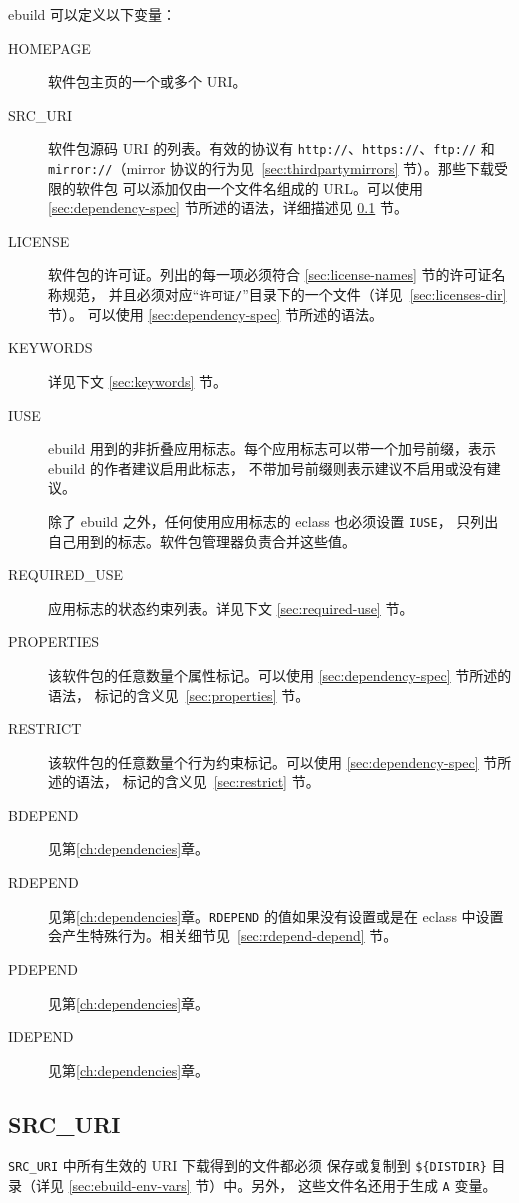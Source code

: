 ebuild 可以定义以下变量：
\begin{description}
\item[HOMEPAGE] 软件包主页的一个或多个 URI。
\item[SRC_URI] 软件包源码 URI 的列表。有效的协议有 \texttt{http://}、\texttt{https://}、\texttt{ftp://} 和
    \texttt{mirror://}（mirror 协议的行为见~\ref{sec:thirdpartymirrors} 节）。那些下载受限的软件包
    可以添加仅由一个文件名组成的 URL。可以使用 \ref{sec:dependency-spec} 节所述的语法，详细描述见
    \ref{sec:src-uri-behaviour} 节。
\item[LICENSE] 软件包的许可证。列出的每一项必须符合 \ref{sec:license-names} 节的许可证名称规范，
    并且必须对应“\texttt{许可证/}”目录下的一个文件（详见~\ref{sec:licenses-dir} 节）。
    可以使用 \ref{sec:dependency-spec} 节所述的语法。
\item[KEYWORDS] 详见下文 \ref{sec:keywords} 节。
\item[IUSE] ebuild 用到的非折叠应用标志。每个应用标志可以带一个加号前缀，表示 ebuild 的作者建议启用此标志，
    不带加号前缀则表示建议不启用或没有建议。

    除了 ebuild 之外，任何使用应用标志的 eclass 也必须设置 \texttt{IUSE}，
    只列出自己用到的标志。软件包管理器负责合并这些值。
\item[REQUIRED_USE] 应用标志的状态约束列表。详见下文 \ref{sec:required-use} 节。
\item[PROPERTIES] 该软件包的任意数量个属性标记。可以使用 \ref{sec:dependency-spec} 节所述的语法，
    标记的含义见~\ref{sec:properties} 节。
\item[RESTRICT] 该软件包的任意数量个行为约束标记。可以使用 \ref{sec:dependency-spec} 节所述的语法，
    标记的含义见~\ref{sec:restrict} 节。
\item[BDEPEND] 见第\ref{ch:dependencies}章。
\item[RDEPEND] 见第\ref{ch:dependencies}章。\texttt{RDEPEND} 的值如果没有设置或是在
    eclass 中设置会产生特殊行为。相关细节见~\ref{sec:rdepend-depend} 节。
\item[PDEPEND] 见第\ref{ch:dependencies}章。
\item[IDEPEND] 见第\ref{ch:dependencies}章。
\end{description}

\subsection{SRC_URI}
\label{sec:src-uri-behaviour}

\texttt{SRC_URI} 中所有生效的 URI 下载得到的文件都必须
保存或复制到 \texttt{\$\{DISTDIR\}} 目录（详见 \ref{sec:ebuild-env-vars} 节）中。另外，
这些文件名还用于生成 \texttt{A} 变量。

